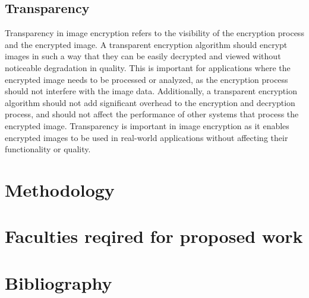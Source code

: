 \documentclass[11pt,a4paper,english]{article}
\begin{document}
\subsection{Transparency}Transparency in image encryption refers to the visibility of the encryption process and the encrypted image. A transparent encryption algorithm should encrypt images in such a way that they can be easily decrypted and viewed without noticeable degradation in quality. This is important for applications where the encrypted image needs to be processed or analyzed, as the encryption process should not interfere with the image data. Additionally, a transparent encryption algorithm should not add significant overhead to the encryption and decryption process, and should not affect the performance of other systems that process the encrypted image. Transparency is important in image encryption as it enables encrypted images to be used in real-world applications without affecting their functionality or quality.
\newpage
\section{Methodology}
\newpage
\section{Faculties reqired for proposed work}
\newpage
\section{Bibliography}

\nocite{*}
\end{document}
